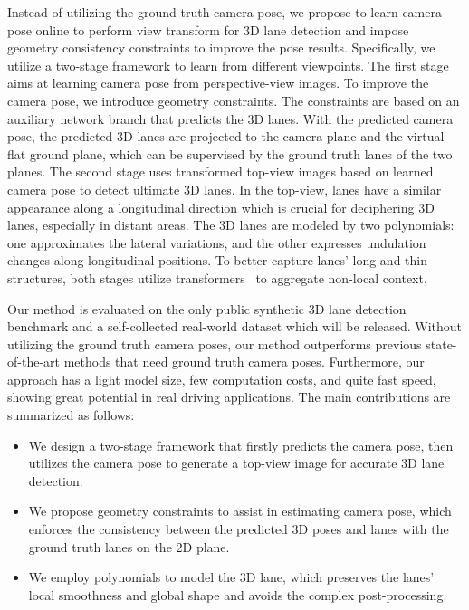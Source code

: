 \documentclass[letterpaper]{article} \usepackage{aaai22}  \usepackage{times}  \usepackage{helvet}  \usepackage{courier}  \usepackage[hyphens]{url}  \usepackage{graphicx} \urlstyle{rm} \def\UrlFont{\rm}  \usepackage{natbib}  \usepackage{caption}
\begin{document}
Instead of utilizing the ground truth camera pose, we propose to learn camera pose online to perform view transform for 3D lane detection and impose geometry consistency constraints to improve the pose results. Specifically, we utilize a two-stage framework to learn from different viewpoints. The first stage aims at learning camera pose from perspective-view images. To improve the camera pose, we introduce geometry constraints. The constraints are based on an auxiliary network branch that predicts the 3D lanes. With the predicted camera pose, the predicted 3D lanes are projected to the camera plane and the virtual flat ground plane, which can be supervised by the ground truth lanes of the two planes. The second stage uses transformed top-view images based on learned camera pose to detect ultimate 3D lanes. In the top-view, lanes have a similar appearance along a longitudinal direction which is crucial for deciphering 3D lanes, especially in distant areas. The 3D lanes are modeled by two polynomials: one approximates the lateral variations, and the other expresses undulation changes along longitudinal positions. To better capture lanes' long and thin structures, both stages utilize transformers~\cite{AttentionIsAllYourNeed} to aggregate non-local context.



Our method is evaluated on the only public synthetic 3D lane detection benchmark and a self-collected real-world dataset which will be released. Without utilizing the ground truth camera poses, our method outperforms previous state-of-the-art methods that need ground truth camera poses. Furthermore, our approach has a light model size, few computation costs, and quite fast speed, showing great potential in real driving applications. The main contributions are summarized as follows:  
\begin{itemize}
 \item We design a two-stage framework that firstly predicts the camera pose, then utilizes the camera pose to generate a top-view image for accurate 3D lane detection. 
\item We propose geometry constraints to assist in estimating camera pose, which enforces the consistency between the predicted 3D poses and lanes with the ground truth lanes on the 2D plane. 
\item We employ polynomials to model the 3D lane, which preserves the lanes' local smoothness and global shape and avoids the complex post-processing. 
\end{itemize}
\end{document}
